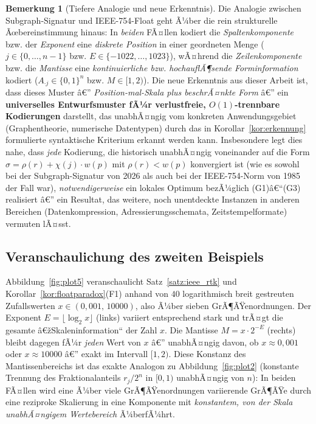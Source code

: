 ﻿\documentclass[a4paper,12pt]{article}
\theoremstyle{definition}
\newtheorem{bemerkung}{Bemerkung}
\begin{document}
\begin{bemerkung}[Tiefere Analogie und neue Erkenntnis]
\label{bem:tiefeanalogie}
	Die Analogie zwischen Subgraph-Signatur und IEEE-754-Float geht Ã¼ber die
	rein strukturelle Ãœbereinstimmung hinaus: In \emph{beiden} FÃ¤llen
	kodiert die \emph{Spaltenkomponente} bzw. der \emph{Exponent} eine
	\emph{diskrete Position} in einer geordneten Menge ($j\in\{0,\ldots,n-1\}$
	bzw. $E\in\{-1022,\ldots,1023\}$), wÃ¤hrend die \emph{Zeilenkomponente}
	bzw. die \emph{Mantisse} eine \emph{kontinuierliche bzw.
	hochauflÃ¶sende Forminformation} kodiert ($A_{\cdot j}\in\{0,1\}^n$ bzw.
	$M\in[1,2)$). Die neue Erkenntnis aus dieser Arbeit ist, dass dieses
	Muster â€” \emph{Position-mal-Skala plus beschrÃ¤nkte Form} â€” ein
	\textbf{universelles Entwurfsmuster fÃ¼r verlustfreie, $O(1)$-trennbare
	Kodierungen} darstellt, das unabhÃ¤ngig vom konkreten Anwendungsgebiet
	(Graphentheorie, numerische Datentypen) durch das in
	Korollar~\ref{kor:erkennung} formulierte syntaktische Kriterium erkannt
	werden kann. Insbesondere legt dies nahe, dass \emph{jede} Kodierung,
	die historisch unabhÃ¤ngig voneinander auf die Form
	$\sigma=\rho(r)+\chi(j)\cdot w(p)$ mit $\rho(r)<w(p)$ konvergiert ist
	(wie es sowohl bei der Subgraph-Signatur von 2026 als auch bei der
	IEEE-754-Norm von 1985 der Fall war), \emph{notwendigerweise} ein
	lokales Optimum bezÃ¼glich (G1)â€“(G3) realisiert â€” ein Resultat, das
	weitere, noch unentdeckte Instanzen in anderen Bereichen
	(Datenkompression, Adressierungsschemata, Zeitstempelformate) vermuten
	lÃ¤sst.
\end{bemerkung}

\subsection{Veranschaulichung des zweiten Beispiels}

Abbildung~\ref{fig:plot5} veranschaulicht Satz~\ref{satz:ieee_rtk} und
Korollar~\ref{kor:floatparadox}(F1) anhand von $40$ logarithmisch breit
gestreuten Zufallswerten $x\in(0{,}001,\,10000)$, also Ã¼ber sieben
GrÃ¶ÃŸenordnungen. Der Exponent $E=\lfloor\log_2 x\rfloor$ (links) variiert
entsprechend stark und trÃ¤gt die gesamte â€žSkaleninformation`` der Zahl $x$.
Die Mantisse $M=x\cdot2^{-E}$ (rechts) bleibt dagegen fÃ¼r \emph{jeden} Wert
von $x$ â€” unabhÃ¤ngig davon, ob $x\approx0{,}001$ oder $x\approx10000$ â€” exakt
im Intervall $[1,2)$. Diese Konstanz des Mantissenbereichs ist das exakte
Analogon zu Abbildung~\ref{fig:plot2} (konstante Trennung des
Fraktionalanteils $r_j/2^n$ in $[0,1)$ unabhÃ¤ngig von $n$): In beiden FÃ¤llen
wird eine Ã¼ber viele GrÃ¶ÃŸenordnungen variierende GrÃ¶ÃŸe durch eine reziproke
Skalierung in eine Komponente mit \emph{konstantem, von der Skala
unabhÃ¤ngigem Wertebereich} Ã¼berfÃ¼hrt.
\end{document}
